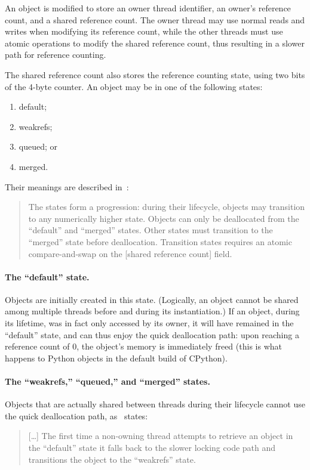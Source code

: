 An object is modified to store an owner thread identifier, an owner's reference count, and a shared reference count.
The owner thread may use normal reads and writes when modifying its reference count, while the other threads must use atomic operations to modify the shared reference count, thus resulting in a slower path for reference counting.

The shared reference count also stores the reference counting state, using two bits of the 4-byte counter.
An object may be in one of the following states:
\begin{enumerate}
    \item default;
    \item weakrefs;
    \item queued; or
    \item merged.
\end{enumerate}
Their meanings are described in~\cite[\S Biased Reference Counting]{pep703}:
\begin{quote}
    The states form a progression: during their lifecycle, objects may transition to any numerically higher state.
    Objects can only be deallocated from the ``default'' and ``merged'' states.
    Other states must transition to the ``merged'' state before deallocation.
    Transition states requires an atomic compare-and-swap on the [shared reference count] field.
\end{quote}

\paragraph{The ``default'' state.}
Objects are initially created in this state.
(Logically, an object cannot be shared among multiple threads before and during its instantiation.)
If an object, during its lifetime, was in fact only accessed by its owner, it will have remained in the ``default'' state, and can thus enjoy the quick deallocation path: upon reaching a reference count of 0, the object's memory is immediately freed (this is what happens to Python objects in the default build of CPython).

\paragraph{The ``weakrefs,'' ``queued,'' and ``merged'' states.}
Objects that are actually shared between threads during their lifecycle cannot use the quick deallocation path, as~\cite[]{pep703} states:
\begin{quote}
    [\ldots] The first time a non-owning thread attempts to retrieve an object in the ``default'' state it falls back to the slower locking code path and transitions the object to the ``weakrefs'' state.
\end{quote}

